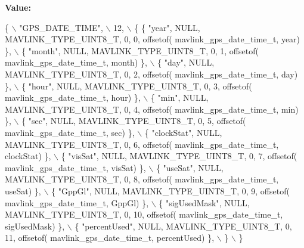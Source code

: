 {\bfseries Value\+:}
\begin{DoxyCode}
\{ \(\backslash\)
    \textcolor{stringliteral}{"GPS\_DATE\_TIME"}, \(\backslash\)
    12, \(\backslash\)
    \{  \{ \textcolor{stringliteral}{"year"}, NULL, MAVLINK_TYPE_UINT8_T, 0, 0, offsetof(
      mavlink_gps_date_time_t, year) \}, \(\backslash\)
         \{ \textcolor{stringliteral}{"month"}, NULL, MAVLINK_TYPE_UINT8_T, 0, 1, offsetof(
      mavlink_gps_date_time_t, month) \}, \(\backslash\)
         \{ \textcolor{stringliteral}{"day"}, NULL, MAVLINK_TYPE_UINT8_T, 0, 2, offsetof(
      mavlink_gps_date_time_t, day) \}, \(\backslash\)
         \{ \textcolor{stringliteral}{"hour"}, NULL, MAVLINK_TYPE_UINT8_T, 0, 3, offsetof(
      mavlink_gps_date_time_t, hour) \}, \(\backslash\)
         \{ \textcolor{stringliteral}{"min"}, NULL, MAVLINK_TYPE_UINT8_T, 0, 4, offsetof(
      mavlink_gps_date_time_t, min) \}, \(\backslash\)
         \{ \textcolor{stringliteral}{"sec"}, NULL, MAVLINK_TYPE_UINT8_T, 0, 5, offsetof(
      mavlink_gps_date_time_t, sec) \}, \(\backslash\)
         \{ \textcolor{stringliteral}{"clockStat"}, NULL, MAVLINK_TYPE_UINT8_T, 0, 6, offsetof(
      mavlink_gps_date_time_t, clockStat) \}, \(\backslash\)
         \{ \textcolor{stringliteral}{"visSat"}, NULL, MAVLINK_TYPE_UINT8_T, 0, 7, offsetof(
      mavlink_gps_date_time_t, visSat) \}, \(\backslash\)
         \{ \textcolor{stringliteral}{"useSat"}, NULL, MAVLINK_TYPE_UINT8_T, 0, 8, offsetof(
      mavlink_gps_date_time_t, useSat) \}, \(\backslash\)
         \{ \textcolor{stringliteral}{"GppGl"}, NULL, MAVLINK_TYPE_UINT8_T, 0, 9, offsetof(
      mavlink_gps_date_time_t, GppGl) \}, \(\backslash\)
         \{ \textcolor{stringliteral}{"sigUsedMask"}, NULL, MAVLINK_TYPE_UINT8_T, 0, 10, offsetof(
      mavlink_gps_date_time_t, sigUsedMask) \}, \(\backslash\)
         \{ \textcolor{stringliteral}{"percentUsed"}, NULL, MAVLINK_TYPE_UINT8_T, 0, 11, offsetof(
      mavlink_gps_date_time_t, percentUsed) \}, \(\backslash\)
         \} \(\backslash\)
\}
\end{DoxyCode}
\mbox{\label{mavlink__msg__gps__date__time_8h_ac5325de80dd706f379f81cc3f170252e}} 
